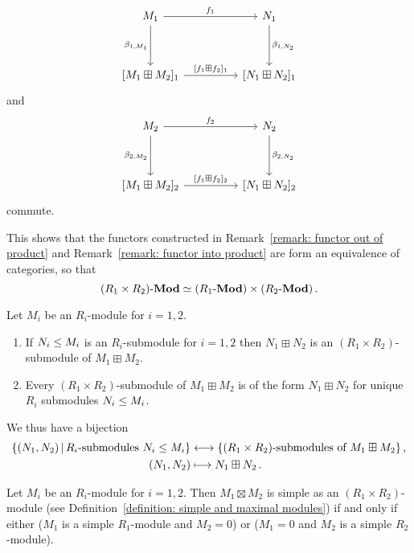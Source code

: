 \begin{theorem}
\begin{enumerate}[resume]
      \[
        \begin{tikzcd}[sep = huge]
            M_1
            \arrow{r}[above]{f_1}
            \arrow{d}[left]{\beta_{1, M_1}}
          & N_1
            \arrow{d}[right]{\beta_{1, N_2}}
          \\
            {[M_1 \boxplus M_2]_1}
            \arrow{r}[above]{{[f_1 \boxplus f_2]_1}}
          & {[N_1 \boxplus N_2]_1}
        \end{tikzcd}
      \]
      and
      \[
        \begin{tikzcd}[sep = huge]
            M_2
            \arrow{r}[above]{f_2}
            \arrow{d}[left]{\beta_{2, M_2}}
          & N_2
            \arrow{d}[right]{\beta_{2, N_2}}
          \\
            {[M_1 \boxplus M_2]_2}
            \arrow{r}[above]{{[f_1 \boxplus f_2]_2}}
          & {[N_1 \boxplus N_2]_2}
        \end{tikzcd}
      \]
      commute.
  \end{enumerate}
\end{theorem}


\begin{remark}
  This shows that the functors constructed in Remark~\ref{remark: functor out of product} and Remark~\ref{remark: functor into product} are form an equivalence of categories, so that
  \[
            (R_1 \times R_2)\text{-}\mathbf{Mod}
    \simeq  (R_1\text{-}\mathbf{Mod}) \times (R_2\text{-}\mathbf{Mod}) \,.
  \]
\end{remark}


\begin{lemma}
  Let $M_i$ be an $R_i$-module for $i = 1, 2$.
  \begin{enumerate}
    \item
      If $N_i \leq M_i$ is an $R_i$-submodule for $i = 1, 2$ then $N_1 \boxplus N_2$ is an $(R_1 \times R_2)$-submodule of $M_1 \boxplus M_2$.
    \item
      Every $(R_1 \times R_2)$-submodule of $M_1 \boxplus M_2$ is of the form $N_1 \boxplus N_2$ for unique $R_i$ submodules $N_i \leq M_i$.
  \end{enumerate}
  We thus have a bijection
  \begin{align*}
    \{ (N_1, N_2) \suchthat \text{$R_i$-submodules $N_i \moduleeq M_i$} \}
    &\longleftrightarrow
    \{ \text{$(R_1 \times R_2)$-submodules of $M_1 \boxplus M_2$} \} \,,
    \\
    (N_1, N_2)
    &\longmapsto
    N_1 \boxplus N_2 \,.
  \end{align*}
\end{lemma}


\begin{corollary}
  Let $M_i$ be an $R_i$-module for $i = 1, 2$.
  Then $M_1 \boxtimes M_2$ is simple as an $(R_1 \times R_2)$-module (see Definition~\ref{definition: simple and maximal modules}) if and only if either ($M_1$ is a simple $R_1$-module and $M_2 = 0$) or ($M_1 = 0$ and $M_2$ is a simple $R_2$-module).
\end{corollary}


